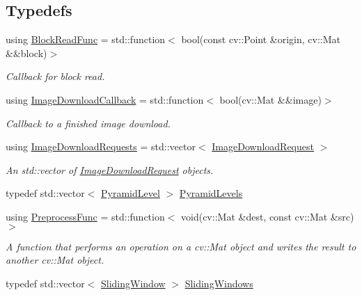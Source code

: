 \subsection*{Typedefs}
\begin{DoxyCompactItemize}
\item 
using \hyperlink{group___imagery_module_ga2238c2ef34502f68956ddef1f477ad95}{Block\+Read\+Func} = std\+::function$<$ bool(const cv\+::\+Point \&origin, cv\+::\+Mat \&\&block)$>$
\begin{DoxyCompactList}\small\item\em Callback for block read. \end{DoxyCompactList}\item 
using \hyperlink{group___imagery_module_gab8f15d39d6d4bd5bcd727b5d8b28a721}{Image\+Download\+Callback} = std\+::function$<$ bool(cv\+::\+Mat \&\&image)$>$
\begin{DoxyCompactList}\small\item\em Callback to a finished image download. \end{DoxyCompactList}\item 
using \hyperlink{group___imagery_module_ga759e24100f96d6dee1eee94f4f1d6898}{Image\+Download\+Requests} = std\+::vector$<$ \hyperlink{structdg_1_1deepcore_1_1imagery_1_1_image_download_request}{Image\+Download\+Request} $>$
\begin{DoxyCompactList}\small\item\em An std\+::vector of \hyperlink{structdg_1_1deepcore_1_1imagery_1_1_image_download_request}{Image\+Download\+Request} objects. \end{DoxyCompactList}\item 
typedef std\+::vector$<$ \hyperlink{structdg_1_1deepcore_1_1imagery_1_1_pyramid_level}{Pyramid\+Level} $>$ \hyperlink{namespacedg_1_1deepcore_1_1imagery_a19b24d2d9a7e8c5b4ab65d1fa42b8b20}{Pyramid\+Levels}
\item 
using \hyperlink{namespacedg_1_1deepcore_1_1imagery_ad59888e5453be057c25213ce51df1439}{Preprocess\+Func} = std\+::function$<$ void(cv\+::\+Mat \&dest, const cv\+::\+Mat \&src)$>$
\begin{DoxyCompactList}\small\item\em A function that performs an operation on a cv\+::\+Mat object and writes the result to another cv\+::\+Mat object. \end{DoxyCompactList}\item 
typedef std\+::vector$<$ \hyperlink{classdg_1_1deepcore_1_1imagery_1_1_sliding_window}{Sliding\+Window} $>$ \hyperlink{namespacedg_1_1deepcore_1_1imagery_af586b82f51aad0d30be6ee5671df62c5}{Sliding\+Windows}
\end{DoxyCompactItemize}
